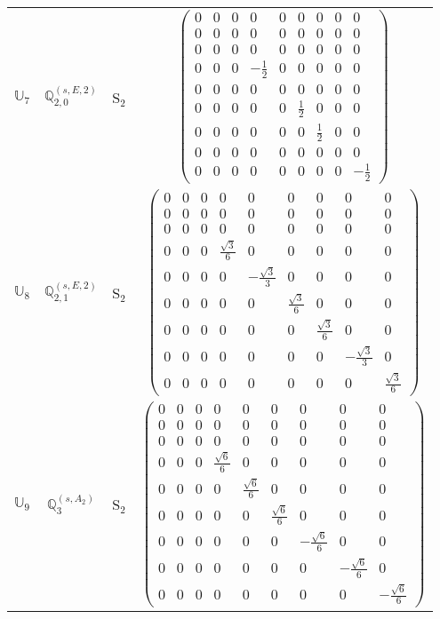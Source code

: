 \documentclass[fleqn,10pt,landscape]{article}
\begin{document}
\begin{itemize}
\begin{center}
\begin{longtable}{c|c|c|c}
$ \mathbb{U}_{7} $ & $\mathbb{Q}_{2,0}^{(s,E,2)}$ & S$_{2}$ & $\begin{pmatrix} 0 & 0 & 0 & 0 & 0 & 0 & 0 & 0 & 0 \\ 0 & 0 & 0 & 0 & 0 & 0 & 0 & 0 & 0 \\ 0 & 0 & 0 & 0 & 0 & 0 & 0 & 0 & 0 \\ 0 & 0 & 0 & - \frac{1}{2} & 0 & 0 & 0 & 0 & 0 \\ 0 & 0 & 0 & 0 & 0 & 0 & 0 & 0 & 0 \\ 0 & 0 & 0 & 0 & 0 & \frac{1}{2} & 0 & 0 & 0 \\ 0 & 0 & 0 & 0 & 0 & 0 & \frac{1}{2} & 0 & 0 \\ 0 & 0 & 0 & 0 & 0 & 0 & 0 & 0 & 0 \\ 0 & 0 & 0 & 0 & 0 & 0 & 0 & 0 & - \frac{1}{2} \end{pmatrix}$ \\
$ \mathbb{U}_{8} $ & $\mathbb{Q}_{2,1}^{(s,E,2)}$ & S$_{2}$ & $\begin{pmatrix} 0 & 0 & 0 & 0 & 0 & 0 & 0 & 0 & 0 \\ 0 & 0 & 0 & 0 & 0 & 0 & 0 & 0 & 0 \\ 0 & 0 & 0 & 0 & 0 & 0 & 0 & 0 & 0 \\ 0 & 0 & 0 & \frac{\sqrt{3}}{6} & 0 & 0 & 0 & 0 & 0 \\ 0 & 0 & 0 & 0 & - \frac{\sqrt{3}}{3} & 0 & 0 & 0 & 0 \\ 0 & 0 & 0 & 0 & 0 & \frac{\sqrt{3}}{6} & 0 & 0 & 0 \\ 0 & 0 & 0 & 0 & 0 & 0 & \frac{\sqrt{3}}{6} & 0 & 0 \\ 0 & 0 & 0 & 0 & 0 & 0 & 0 & - \frac{\sqrt{3}}{3} & 0 \\ 0 & 0 & 0 & 0 & 0 & 0 & 0 & 0 & \frac{\sqrt{3}}{6} \end{pmatrix}$ \\
$ \mathbb{U}_{9} $ & $\mathbb{Q}_{3}^{(s,A_{2})}$ & S$_{2}$ & $\begin{pmatrix} 0 & 0 & 0 & 0 & 0 & 0 & 0 & 0 & 0 \\ 0 & 0 & 0 & 0 & 0 & 0 & 0 & 0 & 0 \\ 0 & 0 & 0 & 0 & 0 & 0 & 0 & 0 & 0 \\ 0 & 0 & 0 & \frac{\sqrt{6}}{6} & 0 & 0 & 0 & 0 & 0 \\ 0 & 0 & 0 & 0 & \frac{\sqrt{6}}{6} & 0 & 0 & 0 & 0 \\ 0 & 0 & 0 & 0 & 0 & \frac{\sqrt{6}}{6} & 0 & 0 & 0 \\ 0 & 0 & 0 & 0 & 0 & 0 & - \frac{\sqrt{6}}{6} & 0 & 0 \\ 0 & 0 & 0 & 0 & 0 & 0 & 0 & - \frac{\sqrt{6}}{6} & 0 \\ 0 & 0 & 0 & 0 & 0 & 0 & 0 & 0 & - \frac{\sqrt{6}}{6} \end{pmatrix}$ \\ \hline

\end{longtable}
\end{center}
\end{itemize}
\end{document}
